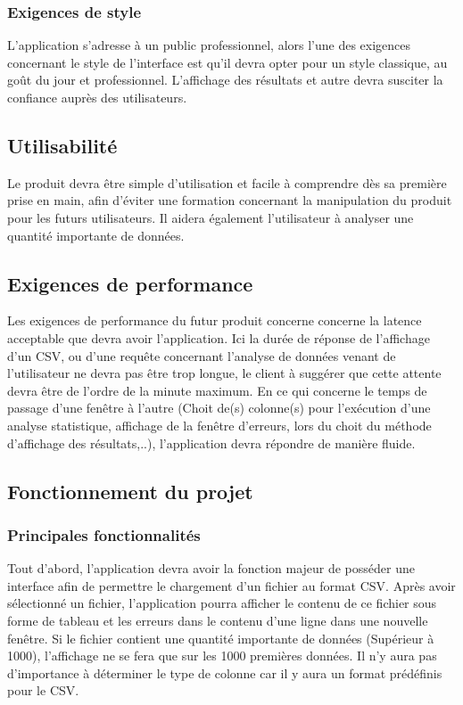 		\subsubsection{Exigences de style}
		L’application s’adresse à un public professionnel, alors l’une des exigences concernant le style de l’interface est qu’il devra opter pour un style classique, au goût du jour et professionnel. L’affichage des résultats et autre devra susciter la confiance auprès des utilisateurs.

		\subsection{Utilisabilité}
		Le produit devra être simple d’utilisation et facile à comprendre dès sa première prise en main, afin d’éviter une formation concernant la manipulation du produit pour les futurs utilisateurs.
		Il aidera également l’utilisateur à analyser une quantité importante de données.

		\subsection{Exigences de performance}
		Les exigences de performance du futur produit concerne concerne la latence acceptable que devra avoir l'application. Ici la durée de réponse de l’affichage d’un CSV, ou d’une requête concernant l’analyse de données venant de l’utilisateur ne devra pas être trop longue, le client à suggérer que cette attente devra être de l’ordre de la minute maximum. En ce qui concerne le temps de passage d'une fenêtre à l'autre (Choit de(s) colonne(s) pour l'exécution d'une analyse statistique, affichage de la fenêtre d'erreurs, lors du choit du méthode d’affichage des résultats,..), l’application devra répondre de manière fluide. 

		\subsection{Fonctionnement du projet}
			\subsubsection{Principales fonctionnalités}
			Tout d’abord, l’application devra avoir la fonction majeur de posséder une interface afin de permettre le chargement d’un fichier au format CSV. Après avoir sélectionné un fichier, l’application pourra afficher le contenu de ce fichier sous forme de tableau et les erreurs dans le contenu d'une ligne dans une nouvelle fenêtre. Si le fichier contient une quantité importante de données (Supérieur à 1000), l’affichage ne se fera que sur les 1000 premières données.
			Il n’y aura pas d’importance à déterminer le type de colonne car il y aura un format prédéfinis pour le CSV.\newline

